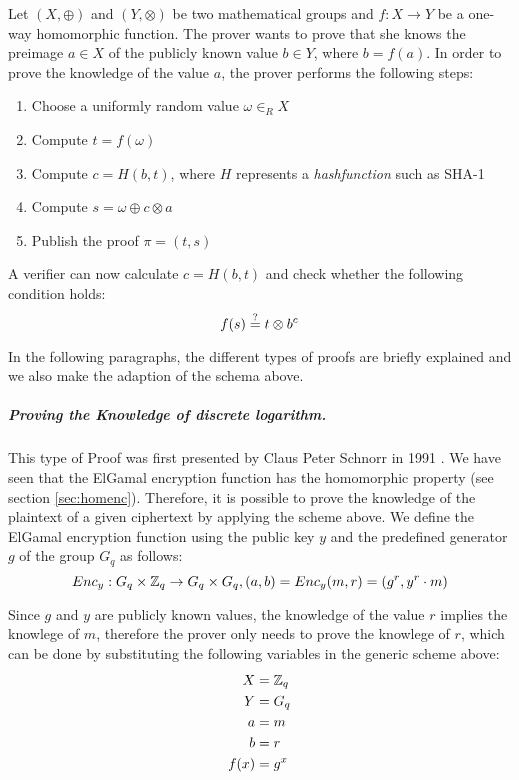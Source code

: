 \documentclass[numbers=noenddot, abstract=on, a4paper, headsepline,
footsepline, oneside, draft=off]{scrreprt}
\newcommand{\myref}[1]{(see section \vref{#1})}
\begin{document}
Let $(X,\oplus)$ and $(Y,\otimes)$ be two mathematical groups and
$f:X \rightarrow Y$ be a one-way homomorphic function. The prover wants to prove
that she knows the preimage $a \in X$ of the publicly known value $b \in Y$,
where $b=f(a)$. In order to prove the knowledge of the value $a$, the prover
performs the following steps:
\begin{enumerate}
  \item Choose a uniformly random value $\omega \in_R X$
  \item Compute $t=f(\omega)$
  \item Compute $c=H(b,t)$, where $H$ represents a \textit{hashfunction} such as
  SHA-1
  \item Compute $s=\omega \oplus c \otimes a$
  \item Publish the proof $\pi = (t,s)$
\end{enumerate}

A verifier can now calculate $c=H(b,t)$ and check whether the following
condition holds:
\begin{equation}
	f(s) \stackrel{?}{=} t \otimes b^c \notag
\end{equation}

 In the following paragraphs, the different types of proofs are briefly
 explained and we also make the adaption of the schema above.
 
\subparagraph{Proving the Knowledge of discrete logarithm.}
This type of Proof was first presented by Claus Peter Schnorr in 1991
\cite{Schnorr91}. We have seen that the ElGamal encryption function has the
homomorphic property \myref{sec:homenc}. Therefore, it is possible to prove the
knowledge of the plaintext of a given ciphertext by applying the scheme above.
We define the ElGamal encryption function using the public key $y$ and the
predefined generator $g$ of the group $G_q$ as follows:
\begin{equation}
	Enc_y:G_q \times \mathbb{Z}_q \rightarrow G_q \times G_q, (a,b) = Enc_y(m,
	r)=(g^r, y^r \cdot m) \notag
\end{equation} 

Since $g$ and $y$ are publicly known values, the knowledge of the value $r$
implies the knowlege of $m$, therefore the prover only needs to prove the
knowlege of $r$, which can be done by substituting the following variables in
the generic scheme above:
\begin{align}
  X &= \mathbb{Z}_q \notag \\
  Y &= G_q \notag \\
  a &=m \notag \\
  b &=r \notag \\
  f(x) &= g^x \notag
\end{align} 
\end{document}
